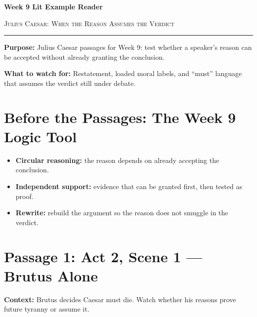\documentclass[12pt]{article}
\begin{document}
\begin{center}
{\LARGE\bfseries Week 9 Lit Example Reader}\par\vspace{0.02em}
{\large\scshape Julius Caesar: When the Reason Assumes the Verdict}\par\vspace{0.06em}
\rule{0.78\textwidth}{0.5pt}
\end{center}

\textbf{Purpose:} Julius Caesar passages for Week 9: test whether a speaker's reason can be accepted without already granting the conclusion.

\textbf{What to watch for:} Restatement, loaded moral labels, and ``must'' language that assumes the verdict still under debate.

\section*{Before the Passages: The Week 9 Logic Tool}

\begin{itemize}[leftmargin=1.3em,itemsep=0.05em,topsep=0.08em,parsep=0.03em]
\item \textbf{Circular reasoning:} the reason depends on already accepting the conclusion.
\item \textbf{Independent support:} evidence that can be granted first, then tested as proof.
\item \textbf{Rewrite:} rebuild the argument so the reason does not smuggle in the verdict.
\end{itemize}

\section*{Passage 1: Act 2, Scene 1 --- Brutus Alone}

\textbf{Context:} Brutus decides Caesar must die. Watch whether his reasons prove future tyranny or assume it.
\end{document}
